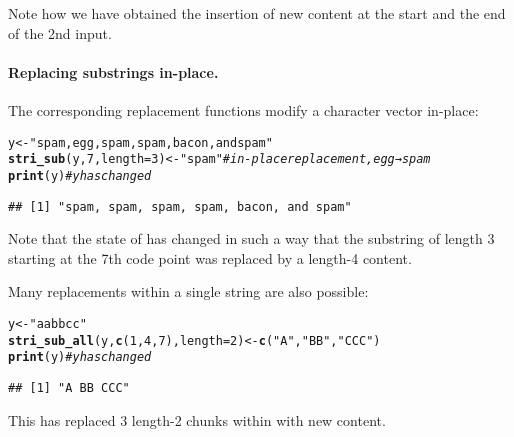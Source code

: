 \documentclass[nojss]{jss}\usepackage[]{graphicx}\usepackage[]{xcolor}
\makeatletter
\newcommand{\hlnum}[1]{\textcolor[rgb]{0.686,0.059,0.569}{#1}}%
\newcommand{\hlstr}[1]{\textcolor[rgb]{0.192,0.494,0.8}{#1}}%
\newcommand{\hlcom}[1]{\textcolor[rgb]{0.678,0.584,0.686}{\textit{#1}}}%
\newcommand{\hlstd}[1]{\textcolor[rgb]{0.345,0.345,0.345}{#1}}%
\newcommand{\hlkwb}[1]{\textcolor[rgb]{0.69,0.353,0.396}{#1}}%
\newcommand{\hlkwc}[1]{\textcolor[rgb]{0.333,0.667,0.333}{#1}}%
\newcommand{\hlkwd}[1]{\textcolor[rgb]{0.737,0.353,0.396}{\textbf{#1}}}%
\newenvironment{kframe}{%
 \def\at@end@of@kframe{}%
 \ifinner\ifhmode%
  \def\at@end@of@kframe{\end{minipage}}%
  \begin{minipage}{\columnwidth}%
 \fi\fi%
 \def\FrameCommand##1{\hskip\@totalleftmargin \hskip-\fboxsep
 \colorbox{shadecolor}{##1}\hskip-\fboxsep
     \hskip-\linewidth \hskip-\@totalleftmargin \hskip\columnwidth}%
 \MakeFramed {\advance\hsize-\width
   \@totalleftmargin\z@ \linewidth\hsize
   \@setminipage}}%
 {\par\unskip\endMakeFramed%
 \at@end@of@kframe}
\newenvironment{knitrout}{}{} %
\makeatother
\begin{document}
\noindent
Note how we have obtained the insertion of new content
at the start and the end of the 2nd input.


\paragraph{Replacing substrings in-place.}
The corresponding {replacement functions} modify
a character vector in-place:

\begin{knitrout}
\color{fgcolor}\begin{kframe}
\begin{alltt}
\hlstd{y} \hlkwb{<-} \hlstr{"spam, egg, spam, spam, bacon, and spam"}
\hlkwd{stri_sub}\hlstd{(y,} \hlnum{7}\hlstd{,} \hlkwc{length}\hlstd{=}\hlnum{3}\hlstd{)} \hlkwb{<-} \hlstr{"spam"}  \hlcom{# in-place replacement, egg → spam}
\hlkwd{print}\hlstd{(y)}                            \hlcom{# y has changed}
\end{alltt}
\begin{verbatim}
## [1] "spam, spam, spam, spam, bacon, and spam"
\end{verbatim}
\end{kframe}
\end{knitrout}

Note that the state of  has changed in such a way that the
substring of length 3 starting at the 7th code point
was replaced by a length-4 content.

Many replacements within a single string are also possible:

\begin{knitrout}
\color{fgcolor}\begin{kframe}
\begin{alltt}
\hlstd{y} \hlkwb{<-} \hlstr{"aa bb cc"}
\hlkwd{stri_sub_all}\hlstd{(y,} \hlkwd{c}\hlstd{(}\hlnum{1}\hlstd{,} \hlnum{4}\hlstd{,} \hlnum{7}\hlstd{),} \hlkwc{length}\hlstd{=}\hlnum{2}\hlstd{)} \hlkwb{<-} \hlkwd{c}\hlstd{(}\hlstr{"A"}\hlstd{,} \hlstr{"BB"}\hlstd{,} \hlstr{"CCC"}\hlstd{)}
\hlkwd{print}\hlstd{(y)}                            \hlcom{# y has changed}
\end{alltt}
\begin{verbatim}
## [1] "A BB CCC"
\end{verbatim}
\end{kframe}
\end{knitrout}

\noindent
This has replaced 3 length-2 chunks within  with new content.
\end{document}
